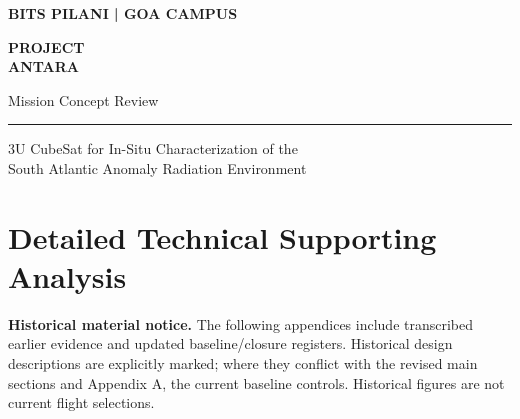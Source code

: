 \documentclass[11pt,a4paper]{article}
\begin{document}
\hypersetup{pageanchor=false}
\begin{titlepage}
\thispagestyle{empty}
\vspace*{17mm}
{\sffamily\bfseries\color{AntaraTeal}\large BITS PILANI | GOA CAMPUS\par}
\vspace{34mm}
{\sffamily\bfseries\color{AntaraNavy}\fontsize{35}{40}\selectfont PROJECT\\[2mm] ANTARA\par}
\vspace{11mm}
{\sffamily\Large Mission Concept Review\par}
{\sffamily\color{AntaraGrey}\MCREditionName\par}
\vspace{8mm}
\noindent\color{AntaraTeal}\rule{0.85\textwidth}{1.6pt}\par\color{black}
\vspace{14mm}
{\large 3U CubeSat for In-Situ Characterization of the\\South Atlantic Anomaly Radiation Environment\par}
\vfill
\end{titlepage}
\hypersetup{pageanchor=true}
\tableofcontents
\clearpage
\listoftables
\listoffigures
\clearpage
{}

\clearpage

\clearpage

\clearpage

\clearpage



\clearpage
\appendix

\section{Detailed Technical Supporting Analysis}
\label{app:technical-support}

\clearpage

\clearpage

\clearpage

\clearpage

\clearpage


\clearpage
\noindent\textbf{Historical material notice.} The following appendices include transcribed earlier evidence and updated baseline/closure registers. Historical design descriptions are explicitly marked; where they conflict with the revised main sections and Appendix A, the current baseline controls. Historical figures are not current flight selections.

\clearpage

\clearpage

\clearpage

\clearpage

\clearpage

\clearpage

\end{document}
